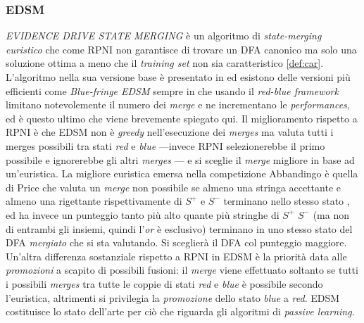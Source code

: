 \subsubsection{EDSM}
\textit{EVIDENCE DRIVE STATE MERGING}  è un algoritmo di \textit{state-merging} \textit{euristico} che come RPNI non garantisce di trovare un \ac{DFA} canonico ma solo una soluzione ottima a meno che il \textit{training set} non sia caratteristico \ref{def:car}. L'algoritmo nella sua versione base è presentato in \cite{Abbadingo98} ed esistono delle versioni più efficienti come \textit{Blue-fringe EDSM} sempre in \cite{Abbadingo98} che usando il \textit{red-blue framework} limitano notevolemente il numero dei \textit{merge} e ne incrementano le \textit{performances}, ed è questo ultimo che viene brevemente spiegato qui.
Il miglioramento rispetto a RPNI è che EDSM non è \textit{greedy} nell'esecuzione dei \textit{merges} ma valuta tutti i merges possibili tra stati \textit{red} e \textit{blue} ---invece RPNI selezionerebbe il primo possibile e ignorerebbe gli altri \textit{merges} --- e si sceglie il \textit{merge} migliore in base ad un'euristica. La migliore euristica emersa nella competizione Abbandingo è quella di Price che valuta un \textit{merge} non possibile se almeno una stringa accettante e almeno una rigettante rispettivamente di $S^{+} \text{ e } S^{-}$ terminano nello stesso stato , ed ha invece un punteggio tanto più alto quante più stringhe di $S^{+}$  $S^{-}$ (ma non di entrambi gli insiemi, quindi l'\textit{or} è esclusivo)  terminano in uno stesso stato del \ac{DFA} \textit{mergiato} che si sta valutando. Si sceglierà il \ac{DFA} col punteggio maggiore.\\
Un'altra differenza sostanziale rispetto a RPNI in EDSM è la priorità data alle \textit{promozioni} a scapito di possibili fusioni: il \textit{merge} viene effettuato soltanto se tutti i possibili \textit{merges} tra tutte le coppie di stati \textit{red} e \textit{blue} è possibile secondo l'euristica, altrimenti si privilegia la \textit{promozione} dello stato \textit{blue} a \textit{red}. 
EDSM costituisce lo stato dell'arte per ciò che riguarda gli algoritmi di \textit{passive learning}.


